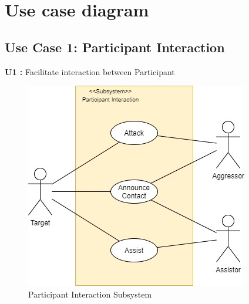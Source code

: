\section{Use case diagram}
\subsection{Use  Case 1: Participant Interaction}

\textbf{U1 :} Facilitate interaction between Participant
\begin{figure}[h!]
\centering
\includegraphics[scale=0.75]{images/ParticipantInteraction.jpg}
\caption{Participant Interaction Subsystem}
\label{fig:ParticipantInteraction}
\end{figure}

